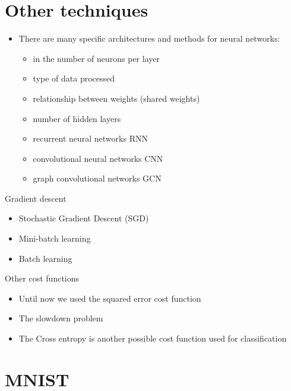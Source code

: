 \documentclass[usenames,dvipsnames]{beamer}
\begin{document}
\section{Other techniques}%
\label{sec:other_techniques}

\begin{frame}
    \begin{itemize}
        \item There are many specific architectures and methods for neural networks:
            \begin{itemize}
                \item in the number of neurons per layer
                \item type of data processed
                \item relationship between weights (shared weights)
                \item number of hidden layers
                \item recurrent neural networks RNN
                \item convolutional neural networks CNN
                \item graph convolutional networks GCN
            \end{itemize}
    \end{itemize}
\end{frame}

\begin{frame}{Gradient descent}
    \begin{itemize}
        \item Stochastic Gradient Descent (SGD)
        \item Mini-batch learning
        \item Batch learning
    \end{itemize}
\end{frame}


\begin{frame}{Other cost functions}
   \begin{itemize}
       \item Until now we used the squared error cost function
       \item The slowdown problem
       \item The Cross entropy is another possible cost function used
           for classification
   \end{itemize} 
\end{frame}


\section{MNIST}%
\label{sec:jj}
\end{document}
